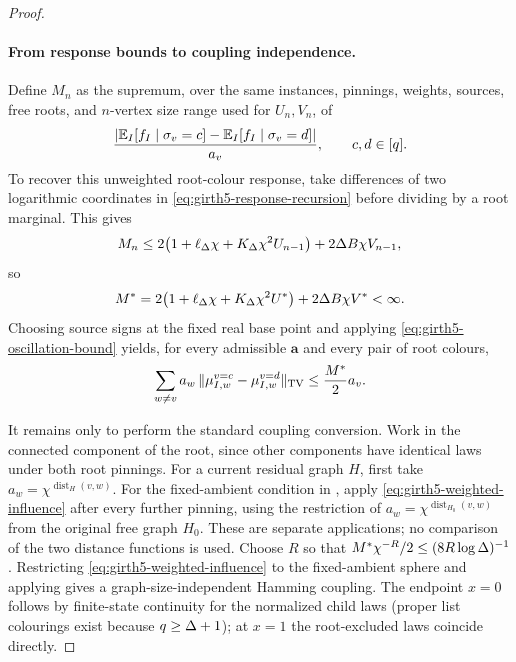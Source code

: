 \begin{proof}
\paragraph{From response bounds to coupling independence.}
Define $M_n$ as the supremum, over the same instances, pinnings, weights,
sources, free roots, and $n$-vertex size range used for $U_n,V_n$, of
\begin{equation}\label{eq:girth5-oscillation-definition}
 \frac{\left|\mathbb E_I[f_I\mid\sigma_v=c]
 -\mathbb E_I[f_I\mid\sigma_v=d]\right|}{a_v},
 \qquad c,d\in[q].
\end{equation}
To recover this unweighted root-colour response, take differences of two logarithmic
coordinates in \eqref{eq:girth5-response-recursion} before dividing by a root marginal.  This gives
\[
 M_n\le2\bigl(1+\ell_\Delta\chi+K_\Delta\chi^2U_{n-1}\bigr)
      +2\Delta B\chi V_{n-1},
\]
so
\begin{equation}\label{eq:girth5-oscillation-bound}
 M^*=2\bigl(1+\ell_\Delta\chi+K_\Delta\chi^2U^*\bigr)
      +2\Delta B\chi V^*<\infty.
\end{equation}
Choosing source signs at the fixed real base point and applying \eqref{eq:girth5-oscillation-bound} yields,
for every admissible $\mathbf a$ and every pair of root colours,
\begin{equation}\label{eq:girth5-weighted-influence}
 \sum_{w\ne v}a_w\,
 \|\mu_{I,w}^{v=c}-\mu_{I,w}^{v=d}\|_{\rm TV}
 \le \frac{M^*}{2}a_v.
\end{equation}

It remains only to perform the standard coupling conversion.  Work in the connected component of the root, since other components have
identical laws under both root pinnings.  For a current residual graph $H$,
first take $a_w=\chi^{\operatorname{dist}_H(v,w)}$.  For the fixed-ambient condition
in \cite[Lemma~5.13]{CLMM2023}, apply \eqref{eq:girth5-weighted-influence} after every further pinning, using the
restriction of $a_w=\chi^{\operatorname{dist}_{H_0}(v,w)}$ from the original
free graph $H_0$.  These are separate applications; no comparison of the two
distance functions is used.  Choose $R$ so that
$M^*\chi^{-R}/2\le(8R\log\Delta)^{-1}$.  Restricting \eqref{eq:girth5-weighted-influence} to the fixed-ambient
sphere and applying \cite[Lemma~5.13]{CLMM2023} gives a graph-size-independent Hamming
coupling.  The endpoint $x=0$ follows by finite-state continuity for the
normalized child laws (proper list colourings exist because $q\ge\Delta+1$);
at $x=1$ the root-excluded laws coincide directly.
\end{proof}
